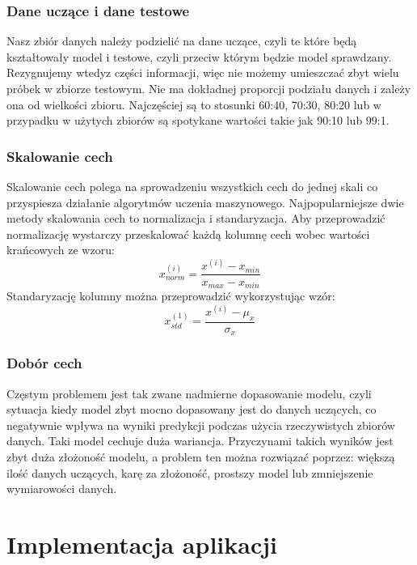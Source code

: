 \documentclass[printmode, eng, openany]{mgr}
\newcommand\tab[1][1cm]{\hspace*{#1}}
\begin{document}
\subsection{Dane uczące i dane testowe}
\tab Nasz zbiór danych należy podzielić na dane uczące, czyli te które będą kształtowały model i testowe, czyli przeciw którym będzie model sprawdzany. Rezygnujemy wtedy\linebreak z części informacji, więc nie możemy umieszczać zbyt wielu próbek w zbiorze testowym. Nie ma dokładnej proporcji podziału danych i zależy ona od wielkości zbioru. Najczęściej są to stosunki 60:40, 70:30, 80:20 lub w przypadku w użytych zbiorów są spotykane wartości takie jak 90:10 lub 99:1.
\subsection{Skalowanie cech}
\tab Skalowanie cech polega na sprowadzeniu wszystkich cech do jednej skali co przyspiesza działanie algorytmów uczenia maszynowego. Najpopularniejsze dwie metody skalowania cech to normalizacja i standaryzacja. Aby przeprowadzić normalizację wystarczy przeskalować każdą kolumnę cech wobec wartości krańcowych ze wzoru:\\
\begin{equation}
x^{(i)}_{norm} = \dfrac{x^{(i)}-x_{min}}{x_{max}-x_{min}}
\end{equation}
Standaryzację kolumny można przeprowadzić wykorzystując wzór:\\
\begin{equation}
x^{(1)}_{std} = \dfrac{x^{(i)} - \mu_x}{\sigma_x}
\end{equation}
\subsection{Dobór cech}
\tab Częstym problemem jest tak zwane nadmierne dopasowanie modelu, czyli sytuacja kiedy model zbyt mocno dopasowany jest do danych uczących, co negatywnie wpływa na wyniki predykcji podczas użycia rzeczywistych zbiorów danych. Taki model cechuje duża wariancja. Przyczynami takich wyników jest zbyt duża złożoność modelu, a problem ten można rozwiązać poprzez: większą ilość danych uczących, karę za złożoność, prostszy model lub zmniejszenie wymiarowości danych. \cite{rash}
\chapter{Implementacja aplikacji}
\end{document}
